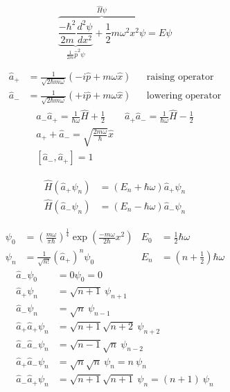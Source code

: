 \noindent\begin{equation*}
    \overbrace{\underbrace{\frac{-\hbar^2}{2m}\frac{d^2\psi}{dx^2}}_{\frac{1}{2m}\hat{p}^2\psi} + \frac{1}{2}m \omega^2 x^2 \psi}^{\widehat{H}\psi}  = E\psi
\end{equation*}

\begin{align*}
    \widehat{a}_{+} & = \frac{1}{\sqrt{2\hbar m \omega}}\left(-i\widehat{p}+m\omega\widehat{x}\right) &  & \text{raising operator}  \\
    \widehat{a}_{-} & = \frac{1}{\sqrt{2\hbar m \omega}}\left(+i\widehat{p}+m\omega\widehat{x}\right) &  & \text{lowering operator}
\end{align*}
\noindent\begin{gather*}
    \widehat{a}_{-}\widehat{a}_{+}=\frac{1}{\hbar\omega}\widehat{H}+\frac{1}{2} \quad\quad \widehat{a}_{+}\widehat{a}_{-}=\frac{1}{\hbar\omega}\widehat{H}-\frac{1}{2} \\
    \widehat{a}_{+} + \widehat{a}_{-} = \sqrt{\frac{2m\omega}{\hbar}} \widehat{x} \\
    \left[\widehat{a}_{-},\widehat{a}_{+}\right] = 1
\end{gather*}

\begin{align*}
    \widehat{H}(\widehat{a}_{+}\psi_n) & = (E_n+\hbar\omega)\widehat{a}_{+}\psi_n \\
    \widehat{H}(\widehat{a}_{-}\psi_n) & = (E_n-\hbar\omega)\widehat{a}_{-}\psi_n
\end{align*}

\noindent\begin{align*}
    \psi_0 & = {\left(\frac{m\omega}{\pi\hbar}\right)}^{\frac{1}{4}}\exp\left(\frac{-m\omega}{2\hbar}x^2\right) & E_0 & = \frac{1}{2}\hbar\omega     \\
    \psi_n & = \frac{1}{\sqrt{n!}}{\left(\widehat{a}_{+}\right)}^n \psi_0                                       & E_n & = (n+\frac{1}{2})\hbar\omega
\end{align*}
\begin{align*}
    \widehat{a}_{-}\psi_0                & = 0\psi_0 = 0                                      \\
    \widehat{a}_{+}\psi_n                & = \sqrt{n+1}\:\psi_{n+1}                           \\
    \widehat{a}_{-}\psi_n                & = \sqrt{n}\:\psi_{n-1}                             \\
    \widehat{a}_{+}\widehat{a}_{+}\psi_n & = \sqrt{n+1}\sqrt{n+2}\:\psi_{n+2}                 \\
    \widehat{a}_{-}\widehat{a}_{-}\psi_n & = \sqrt{n-1}\sqrt{n}\:\psi_{n-2}                   \\
    \widehat{a}_{+}\widehat{a}_{-}\psi_n & = \sqrt{n}\sqrt{n}\:\psi_{n} = n \:\psi_{n}        \\
    \widehat{a}_{-}\widehat{a}_{+}\psi_n & = \sqrt{n+1}\sqrt{n+1}\:\psi_{n} = (n+1)\:\psi_{n}
\end{align*}

